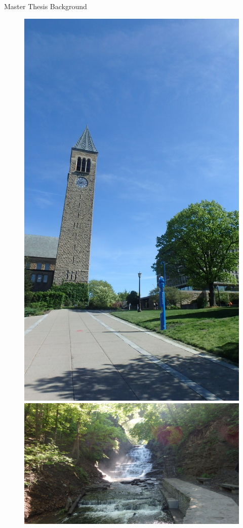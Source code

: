 \documentclass[10pt]{beamer}
\begin{document}
\begin{frame}{Master Thesis Background}
\begin{figure}
	\begin{minipage}{0.47\textwidth}
	\includegraphics[scale=0.1,angle=-90]{chess1.JPG}
	\end{minipage}
	\begin{minipage}{0.5\textwidth}
	\includegraphics[scale=0.1]{chess2.JPG}
	\end{minipage}


\end{figure}
\end{frame}
\end{document}
